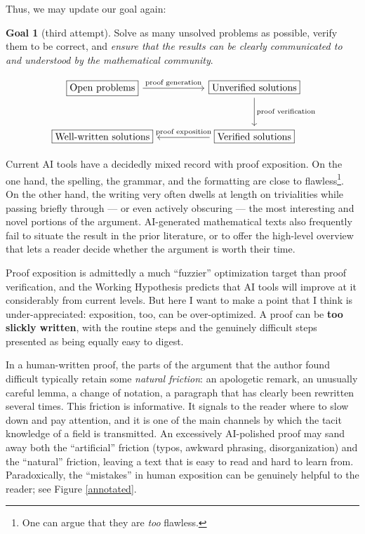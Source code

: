 \documentclass[12pt]{amsart}
\theoremstyle{definition}
\newtheorem{goal}{Goal}[section]
\begin{document}
Thus, we may update our goal again:

\begin{goal}[third attempt]\label{goal3}
Solve as many unsolved problems as possible, verify them to be correct, and \emph{ensure that the results can be clearly communicated to and understood by the mathematical community}.
\end{goal}

\[
\begin{tikzcd}[column sep=huge, row sep=large]
  \boxed{\text{Open problems}} \arrow[r, "\text{proof generation}"] & \boxed{\text{Unverified solutions}} \arrow[d, "\text{proof verification}"] \\
  \boxed{\text{Well-written solutions}} & \boxed{\text{Verified solutions}} \arrow[l, "\text{proof exposition}"']
\end{tikzcd}
\]

Current AI tools have a decidedly mixed record with proof exposition.  On the one hand, the spelling, the grammar, and the formatting are close to flawless\footnote{One can argue that they are \emph{too} flawless.}.  On the other hand, the writing very often dwells at length on trivialities while passing briefly through --- or even actively obscuring --- the most interesting and novel portions of the argument.  AI-generated mathematical texts also frequently fail to situate the result in the prior literature, or to offer the high-level overview that lets a reader decide whether the argument is worth their time.

Proof exposition is admittedly a much ``fuzzier'' optimization target than proof verification, and the Working Hypothesis predicts that AI tools will improve at it considerably from current levels.  But here I want to make a point that I think is under-appreciated: exposition, too, can be over-optimized.  A proof can be \textbf{too slickly written}, with the routine steps and the genuinely difficult steps presented as being equally easy to digest.

In a human-written proof, the parts of the argument that the author found difficult typically retain some \emph{natural friction}: an apologetic remark, an unusually careful lemma, a change of notation, a paragraph that has clearly been rewritten several times.  This friction is informative.  It signals to the reader where to slow down and pay attention, and it is one of the main channels by which the tacit knowledge of a field is transmitted.  An excessively AI-polished proof may sand away both the ``artificial'' friction (typos, awkward phrasing, disorganization) and the ``natural'' friction, leaving a text that is easy to read and hard to learn from.  Paradoxically, the ``mistakes'' in human exposition can be genuinely helpful to the reader; see Figure \ref{annotated}.
\end{document}
